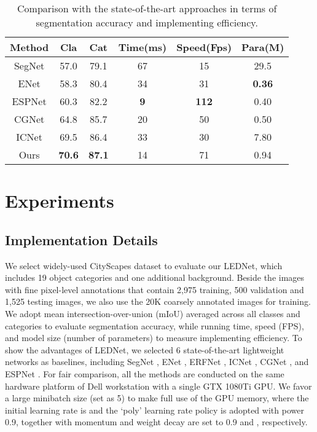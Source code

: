 \documentclass{article}
\begin{document}
\begin{table}[!t]
\tabcolsep 1.2mm \caption{Comparison with the state-of-the-art approaches in terms of segmentation accuracy and implementing efficiency.}
\begin{center}
\begin{tabular}{|c||ccccc|}
\hline
Method & Cla &Cat &Time(ms) &Speed(Fps) &Para(M) \\
\hline
\hline
SegNet\cite{Badrinarayanan2015Segnet}  &57.0 &79.1 &67 &15 &29.5\\
ENet\cite{Paszke2016enet}              &58.3 &80.4 &34 &31 &\textbf{0.36}\\
ESPNet\cite{Mehta2018espnet}           &60.3 &82.2 &\textbf{9} &\textbf{112} &0.40\\
CGNet\cite{wu2018cgnet}                &64.8 &85.7 &20 &50 &0.50\\
ICNet \cite{Zhao2018ICnet}             &69.5 &86.4 &33 &30 &7.80\\
\hline
Ours                                   &\textbf{70.6} &\textbf{87.1} &14 &71 &0.94\\
\hline
\end{tabular}
\end{center}\label{tab:Result1}
\end{table}

\section{Experiments}\label{sec:experiments}

\subsection{Implementation Details}\label{sec:Implementation}

We select widely-used CityScapes dataset \cite{Cordts2016the} to evaluate our LEDNet, which includes 19 object categories and one additional background. Beside the images with fine pixel-level annotations that contain 2,975 training, 500 validation and 1,525 testing images, we also use the 20K coarsely annotated images for training. We adopt mean intersection-over-union (mIoU) averaged across all classes and categories to evaluate segmentation accuracy, while running time, speed (FPS), and model size (number of parameters) to measure implementing efficiency. To show the advantages of LEDNet, we selected 6 state-of-the-art lightweight networks as baselines, including SegNet \cite{Badrinarayanan2015Segnet}, ENet \cite{Paszke2016enet}, ERFNet \cite{Romera2018erfnet}, ICNet \cite{Zhao2018ICnet}, CGNet \cite{wu2018cgnet}, and ESPNet \cite{Mehta2018espnet}. For fair comparison, all the methods are conducted on the same hardware platform of Dell workstation with a single GTX 1080Ti GPU. We favor a large minibatch size (set as 5) to make full use of the GPU memory, where the initial learning rate is  and the `poly' learning rate policy is adopted with power 0.9, together with momentum and weight decay are set to 0.9 and , respectively.
\end{document}
